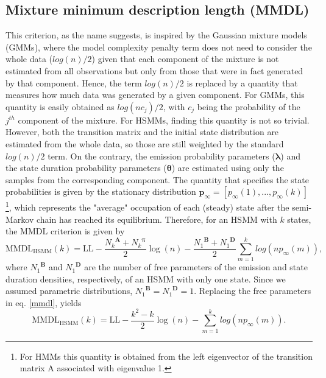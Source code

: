 \documentclass[extendedabs]{recpad2k}
\begin{document}
\subsection{Mixture minimum description length (MMDL)}
This criterion, as the name suggests, is inspired by the Gaussian mixture models (GMMs), where the model complexity penalty term does not need to consider the whole data ($log(n)/2$) given that each component of the mixture is not estimated from all observations but only from those that were in fact generated by that component. Hence, the term $log(n)/2$ is replaced by a quantity that measures how much data was generated by a given component. %
For GMMs, this quantity is easily obtained as $log(nc_j)/2$, with $c_j$ being the probability of the $j^{th}$ component of the mixture.
For HSMMs, finding this quantity is not so trivial. However, both the transition matrix and the initial state distribution are estimated from the whole data, so those are still weighted by the standard $log(n)/2$ term. On the contrary, the emission probability parameters ($\boldsymbol{\lambda}$) and the state duration probability parameters ($\boldsymbol{\theta}$) are estimated using only the samples from the corresponding component. The quantity that specifies the state probabilities is given by the stationary distribution $\boldsymbol{p}_\infty=[p_\infty(1),...,p_\infty(k)]$\footnote{For HMMs this quantity is obtained from the left eigenvector of the transition matrix A associated with eigenvalue 1.}, which represents the "average" occupation of each (steady) state after the semi-Markov chain has reached its equilibrium. Therefore, for an HSMM with $k$ states, the MMDL criterion is given by
\begin{equation}
    \text{MMDL}_{\text{HSMM}}(k) = \text{LL}-\dfrac{{N_k}^{\boldsymbol{A}}+{N_k}^{\boldsymbol{\pi}}}{2}\log(n)-\dfrac{{N_1}^{\boldsymbol{B}}+{N_1}^{\boldsymbol{D}}}{2}\sum_{m=1}^k log(np_\infty(m)),
    \label{mmdl}
\end{equation}
where ${N_1}^{\boldsymbol{B}}$  and ${N_1}^{\boldsymbol{D}}$ are the number of free parameters of the emission and state duration densities, respectively, of an HSMM with only one state. Since we assumed parametric distributions, ${N_1}^{\boldsymbol{B}}= {N_1}^{\boldsymbol{D}}=1$. Replacing the free parameters in eq. \eqref{mmdl}, yields
\begin{equation}
    \text{MMDL}_{\text{HSMM}}(k) = \text{LL}-\dfrac{k^2-k}{2}\log(n)-\sum_{m=1}^k log(np_\infty(m)).
    \label{mmdl_hsmm}
\end{equation}
\end{document}
